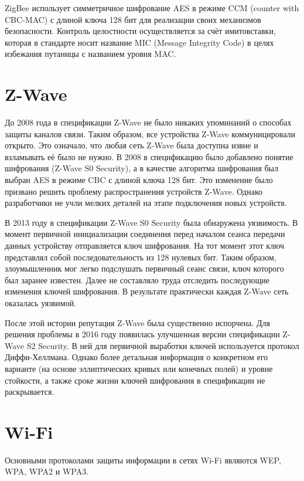 	ZigBee использует симметричное шифрование AES в режиме CCM (counter with CBC-MAC) с длиной ключа 128 бит для 
	реализации своих механизмов безопасности. Контроль целостности осуществляется за счёт имитовставки, которая 
	в стандарте носит название MIC (Message Integrity Code) в целях избежания путаницы с названием уровня MAC.

	
	\section{Z-Wave}
	
	До 2008 года в спецификации Z-Wave не было никаких упоминаний о способах защиты каналов связи. 
	Таким образом, все устройства Z-Wave коммуницировали открыто. Это означало, что любая сеть Z-Wave 
	была доступна извне и взламывать её было не нужно. В 2008 в спецификацию было добавлено понятие 
	шифрования (Z-Wave S0 Security), а в качестве алгоритма шифрования был выбран AES 
	в режиме CBC с длиной ключа 128 бит. 
	Это изменение было призвано решить проблему распространения устройств Z-Wave. Однако разработчики
	не учли мелких деталей на этапе подключения новых устройств.
	
	В 2013 году в спецификации  Z-Wave S0 Security была обнаружена уязвимость. В момент первичной 
	инициализации соединения перед началом сеанса передачи данных устройству отправляется ключ шифрования.
	На тот момент этот ключ представлял собой последовательность из 128 нулевых бит. Таким образом, злоумышленник
	мог легко подслушать первичный сеанс связи, ключ которого был заранее известен. Далее не
	составляло труда отследить последующие изменения ключей шифрования. В результате практически
	каждая Z-Wave сеть оказалась уязвимой.
	
	После этой истории репутация Z-Wave была существенно испорчена. Для решения проблемы в 2016 году
	появилась улучшенная версии спецификации Z-Wave S2 Security. В ней для первичной выработки ключей
	используется протокол Диффи-Хеллмана. Однако более детальная информация о конкретном его варианте
	(на основе эллиптических кривых или конечных полей) и уровне стойкости, а также сроке жизни ключей
	шифрования в спецификации не раскрывается.
	
	
	\section{Wi-Fi}
	
	Основными протоколами защиты информации в сетях Wi-Fi являются WEP, WPA, WPA2 и WPA3.
	
